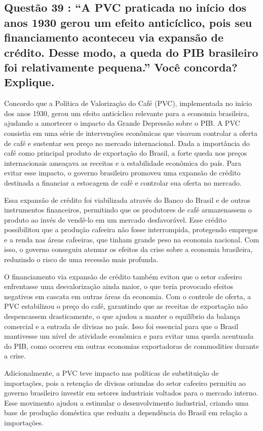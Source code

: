 \documentclass[a4paper,12pt]{article}[abntex2]
\begin{document}
\subsection{\textbf{Questão 39 : “A PVC praticada no início dos anos 1930 gerou um efeito anticíclico, pois seu financiamento aconteceu via expansão de crédito. Desse modo, a queda do PIB brasileiro foi relativamente pequena.” Você concorda? Explique.}}

Concordo que a Política de Valorização do Café (PVC), implementada no início dos anos 1930, gerou um efeito anticíclico relevante para a economia brasileira, ajudando a amortecer o impacto da Grande Depressão sobre o PIB. A PVC consistia em uma série de intervenções econômicas que visavam controlar a oferta de café e sustentar seu preço no mercado internacional. Dada a importância do café como principal produto de exportação do Brasil, a forte queda nos preços internacionais ameaçava as receitas e a estabilidade econômica do país. Para evitar esse impacto, o governo brasileiro promoveu uma expansão de crédito destinada a financiar a estocagem de café e controlar sua oferta no mercado.

Essa expansão de crédito foi viabilizada através do Banco do Brasil e de outros instrumentos financeiros, permitindo que os produtores de café armazenassem o produto ao invés de vendê-lo em um mercado desfavorável. Esse crédito possibilitou que a produção cafeeira não fosse interrompida, protegendo empregos e a renda nas áreas cafeeiras, que tinham grande peso na economia nacional. Com isso, o governo conseguiu atenuar os efeitos da crise sobre a economia brasileira, reduzindo o risco de uma recessão mais profunda.

O financiamento via expansão de crédito também evitou que o setor cafeeiro enfrentasse uma desvalorização ainda maior, o que teria provocado efeitos negativos em cascata em outras áreas da economia. Com o controle de oferta, a PVC estabilizou o preço do café, garantindo que as receitas de exportação não despencassem drasticamente, o que ajudou a manter o equilíbrio da balança comercial e a entrada de divisas no país. Isso foi essencial para que o Brasil mantivesse um nível de atividade econômica e para evitar uma queda acentuada do PIB, como ocorreu em outras economias exportadoras de commodities durante a crise.

Adicionalmente, a PVC teve impacto nas políticas de substituição de importações, pois a retenção de divisas oriundas do setor cafeeiro permitiu ao governo brasileiro investir em setores industriais voltados para o mercado interno. Esse movimento ajudou a estimular o desenvolvimento industrial, criando uma base de produção doméstica que reduziu a dependência do Brasil em relação a importações.
\end{document}
